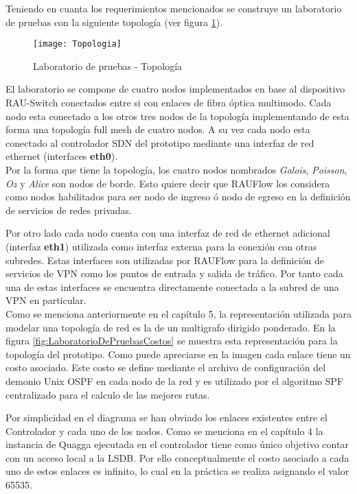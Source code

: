 Teniendo en cuanta los requerimientos mencionados se construye un laboratorio de pruebas con la siguiente topolog\'ia (ver figura \ref{fig:LaboratorioDePruebasTopo}).
  
\begin{figure}[ht!] 
\centering    
\texttt{[image: Topologia]}
\caption[Laboratorio de pruebas - Topolog\'ia]{Laboratorio de pruebas - Topolog\'ia}
\label{fig:LaboratorioDePruebasTopo}
\end{figure}

El laboratorio se compone de cuatro nodos implementados en base al dispositivo RAU-Switch conectados entre si con enlaces de fibra \'optica multimodo. Cada nodo esta conectado a los otros tres nodos de la topolog\'ia implementando de esta forma una topolog\'ia full mesh de cuatro nodos. A su vez cada nodo esta conectado al controlador SDN del prototipo mediante una interfaz de red ethernet (interfaces \textbf{eth0}).\\

Por la forma que tiene la topolog\'ia, los cuatro nodos nombrados \textit{Galois}, \textit{Poisson}, \textit{Oz} y \textit{Alice} son nodos de borde. Esto quiere decir que RAUFlow los considera como nodos habilitados para ser nodo de ingreso \'o nodo de egreso en la definici\'on de servicios de redes privadas.

Por otro lado cada nodo cuenta con una interfaz de red de ethernet adicional (interfaz \textbf{eth1}) utilizada como interfaz externa para la conexi\'on con otras subredes. Estas interfaces son utilizadas por RAUFlow para la definici\'on de servicios de VPN como los puntos de entrada y salida de tr\'afico. Por tanto cada una de estas interfaces se encuentra directamente conectada a la subred de una VPN en particular.\\  

Como se menciona anteriormente en el cap\'itulo 5, la representaci\'on utilizada para modelar una topolog\'ia de red es la de un multigrafo dirigido ponderado. En la figura \ref{fig:LaboratorioDePruebasCostos} se muestra esta representaci\'on para la topolog\'ia del prototipo. Como puede apreciarse en la imagen cada enlace tiene un costo asociado. Este costo se define mediante el archivo de configuraci\'on del demonio Unix OSPF en cada nodo de la red y es utilizado por el algoritmo SPF centralizado para el calculo de las mejores rutas.

Por simplicidad en el diagrama se han obviado los enlaces existentes entre el Controlador y cada uno de los nodos. Como se menciona en el cap\'itulo 4 la instancia de Quagga ejecutada en el controlador tiene como \'unico objetivo contar con un acceso local a la LSDB. Por ello conceptualmente el costo asociado a cada uno de estos enlaces es infinito, lo cual en la pr\'actica se realiza asignando el valor 65535.  

